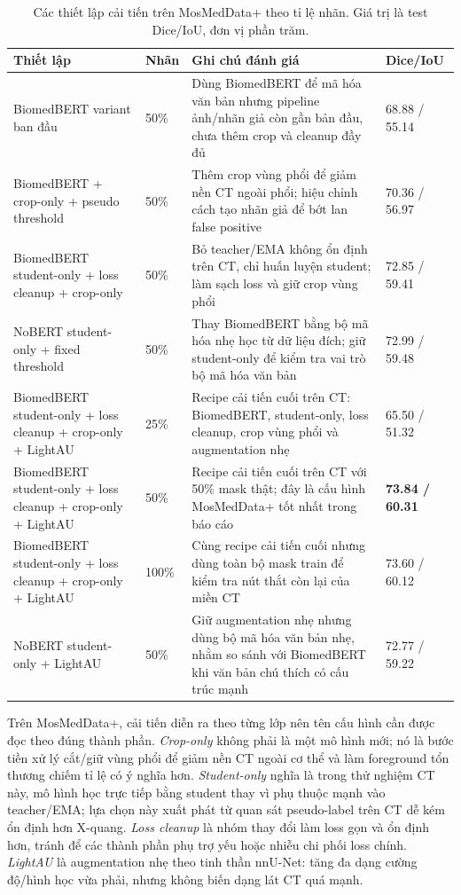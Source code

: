 \begin{table}[H]
  \centering
  \caption{Các thiết lập cải tiến trên MosMedData+ theo tỉ lệ nhãn. Giá trị là test Dice/IoU, đơn vị phần trăm.}
  \label{tab:mosmed-ablation}
  \scriptsize
  \renewcommand{\arraystretch}{1.12}
  \setlength{\tabcolsep}{4pt}
  \begin{tabularx}{\textwidth}{@{}L Y L Y@{}}
    \toprule
    Thiết lập & Nhãn & Ghi chú đánh giá & Dice/IoU \\
    \midrule
    BiomedBERT variant ban đầu & 50\% & Dùng BiomedBERT để mã hóa văn bản nhưng pipeline ảnh/nhãn giả còn gần bản đầu, chưa thêm crop và cleanup đầy đủ & 68.88 / 55.14 \\
    BiomedBERT + crop-only + pseudo threshold & 50\% & Thêm crop vùng phổi để giảm nền CT ngoài phổi; hiệu chỉnh cách tạo nhãn giả để bớt lan false positive & 70.36 / 56.97 \\
    BiomedBERT student-only + loss cleanup + crop-only & 50\% & Bỏ teacher/EMA không ổn định trên CT, chỉ huấn luyện student; làm sạch loss và giữ crop vùng phổi & 72.85 / 59.41 \\
    NoBERT student-only + fixed threshold & 50\% & Thay BiomedBERT bằng bộ mã hóa nhẹ học từ dữ liệu đích; giữ student-only để kiểm tra vai trò bộ mã hóa văn bản & 72.99 / 59.48 \\
    BiomedBERT student-only + loss cleanup + crop-only + LightAU & 25\% & Recipe cải tiến cuối trên CT: BiomedBERT, student-only, loss cleanup, crop vùng phổi và augmentation nhẹ & 65.50 / 51.32 \\
    BiomedBERT student-only + loss cleanup + crop-only + LightAU & 50\% & Recipe cải tiến cuối trên CT với 50\% mask thật; đây là cấu hình MosMedData+ tốt nhất trong báo cáo & \textbf{73.84 / 60.31} \\
    BiomedBERT student-only + loss cleanup + crop-only + LightAU & 100\% & Cùng recipe cải tiến cuối nhưng dùng toàn bộ mask train để kiểm tra nút thắt còn lại của miền CT & 73.60 / 60.12 \\
    NoBERT student-only + LightAU & 50\% & Giữ augmentation nhẹ nhưng dùng bộ mã hóa văn bản nhẹ, nhằm so sánh với BiomedBERT khi văn bản chú thích có cấu trúc mạnh & 72.77 / 59.22 \\
    \bottomrule
  \end{tabularx}
\end{table}
\FloatBarrier

Trên MosMedData+, cải tiến diễn ra theo từng lớp nên tên cấu hình cần được đọc theo đúng thành phần. \textit{Crop-only} không phải là một mô hình mới; nó là bước tiền xử lý cắt/giữ vùng phổi để giảm nền CT ngoài cơ thể và làm foreground tổn thương chiếm tỉ lệ có ý nghĩa hơn. \textit{Student-only} nghĩa là trong thử nghiệm CT này, mô hình học trực tiếp bằng student thay vì phụ thuộc mạnh vào teacher/EMA; lựa chọn này xuất phát từ quan sát pseudo-label trên CT dễ kém ổn định hơn X-quang. \textit{Loss cleanup} là nhóm thay đổi làm loss gọn và ổn định hơn, tránh để các thành phần phụ trợ yếu hoặc nhiễu chi phối loss chính. \textit{LightAU} là augmentation nhẹ theo tinh thần nnU-Net: tăng đa dạng cường độ/hình học vừa phải, nhưng không biến dạng lát CT quá mạnh.

